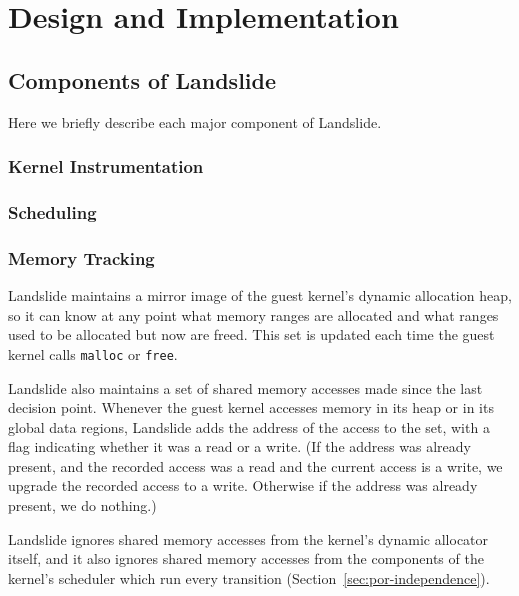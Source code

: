 \section{Design and Implementation}
\subsection{Components of Landslide}

Here we briefly describe each major component of Landslide. %

\subsubsection{Kernel Instrumentation}
\label{sec:components-kern}

\subsubsection{Scheduling}
\label{sec:components-sched}


\subsubsection{Memory Tracking}

Landslide maintains a mirror image of the guest kernel's dynamic allocation heap, so it can know at any point what memory ranges are allocated and what ranges used to be allocated but now are freed. This set is updated each time the guest kernel calls \texttt{malloc} or \texttt{free}.

Landslide also maintains a set of shared memory accesses made since the last decision point. Whenever the guest kernel accesses memory in its heap or in its global data regions, Landslide adds the address of the access to the set, with a flag indicating whether it was a read or a write. (If the address was already present, and the recorded access was a read and the current access is a write, we upgrade the recorded access to a write. Otherwise if the address was already present, we do nothing.)

Landslide ignores shared memory accesses from the kernel's dynamic allocator itself, and it also ignores shared memory accesses from the components of the kernel's scheduler which run every transition (Section~\ref{sec:por-independence}).

